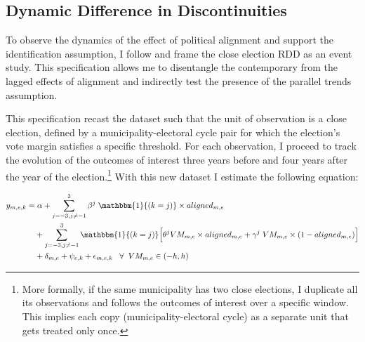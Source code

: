 \documentclass[dv_diss_main.tex]{subfiles}
\begin{document}
\subsection{Dynamic Difference in Discontinuities}
 
To observe the dynamics of the effect of political alignment and support the identification assumption, I follow \cite{cellini2010value} and frame the close election RDD as an event study. This specification allows me to disentangle the contemporary from the lagged effects of alignment and indirectly test the presence of the parallel trends assumption. 


This specification recast the dataset such that the unit of observation is a close election, defined  by a municipality-electoral cycle pair for which the election's vote margin satisfies a specific threshold. For each observation, I proceed to track the evolution of the outcomes of interest three years before and four years after the year of the election.\footnote{ More formally, if the same municipality has two close elections, I duplicate all its observations and follows the outcomes of interest over a specific window. This implies each copy (municipality-electoral cycle) as a separate unit that gets treated only once.} With this new dataset I estimate the following equation: 



\begin{equation}\label{eq:event}
\begin{split}
y_{m,e,k}= &\; \alpha + \sum_{j=-3, j\neq -1}^3  \beta^j \; \mathbbm{1}{(k=j)}\times aligned_{m,e} \\
& + \sum_{j=-3, j\neq -1}^3 \mathbbm{1}{(k=j)} \Big[ \theta^j VM_{m,e} \times aligned_{m,e} +   \gamma^j \; VM_{m,e}\times(1-aligned_{m,e}) \Big] \\
& +  \delta_{m,e} + \psi_{e,k}  + \epsilon_{m,e,k} \;\; \;\forall \;\; VM_{m,e} \in (-h, h)
\end{split}
\end{equation}
\end{document}
